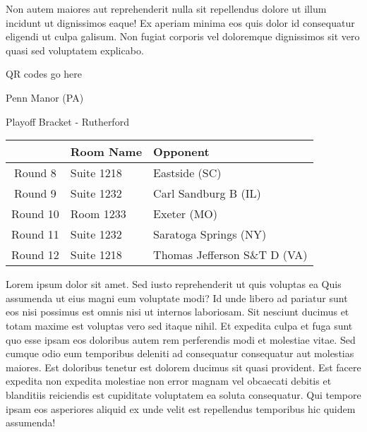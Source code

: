 \documentclass{article}%
\begin{document}
\newline%
Non autem maiores aut reprehenderit nulla sit repellendus dolore ut illum incidunt ut dignissimos eaque! Ex aperiam minima eos quis dolor id consequatur eligendi ut culpa galisum. Non fugiat corporis vel doloremque dignissimos sit vero quasi sed voluptatem explicabo.\newline%
\newline%
%
\vspace*{30pt}%
\begin{center}%
\begin{Huge}%
QR codes go here%
\end{Huge}%
\end{center}%
\newpage%
\begin{center}%
\begin{Huge}%
Penn Manor (PA)%
\end{Huge}%
\vspace*{8pt}%
\linebreak%
\begin{Large}%
Playoff Bracket {-} Rutherford%
\end{Large}%
\end{center}%
\begin{tabularx}{\textwidth}{|c|Y|Y|}%
\hline%
&Room Name&Opponent\\%
\hline%
Round 8&Suite 1218&Eastside (SC)\\%
Round 9&Suite 1232&Carl Sandburg B (IL)\\%
Round 10&Room 1233&Exeter (MO)\\%
Round 11&Suite 1232&Saratoga Springs (NY)\\%
Round 12&Suite 1218&Thomas Jefferson S\&T D (VA)\\%
\hline%
\end{tabularx}%
\vspace*{8pt}%
\linebreak%
\newline%
\newline%
Lorem ipsum dolor sit amet. Sed iusto reprehenderit ut quis voluptas ea Quis assumenda ut eius magni eum voluptate modi? Id unde libero ad pariatur sunt eos nisi possimus est omnis nisi ut internos laboriosam. Sit nesciunt ducimus et totam maxime est voluptas vero sed itaque nihil. Et expedita culpa et fuga sunt quo esse ipsam eos doloribus autem rem perferendis modi et molestiae vitae.\newline%
\newline%
Sed cumque odio eum temporibus deleniti ad consequatur consequatur aut molestias maiores. Est doloribus tenetur est dolorem ducimus sit quasi provident. Est facere expedita non expedita molestiae non error magnam vel obcaecati debitis et blanditiis reiciendis est cupiditate voluptatem ea soluta consequatur. Qui tempore ipsam eos asperiores aliquid ex unde velit est repellendus temporibus hic quidem assumenda!\newline%
\end{document}
